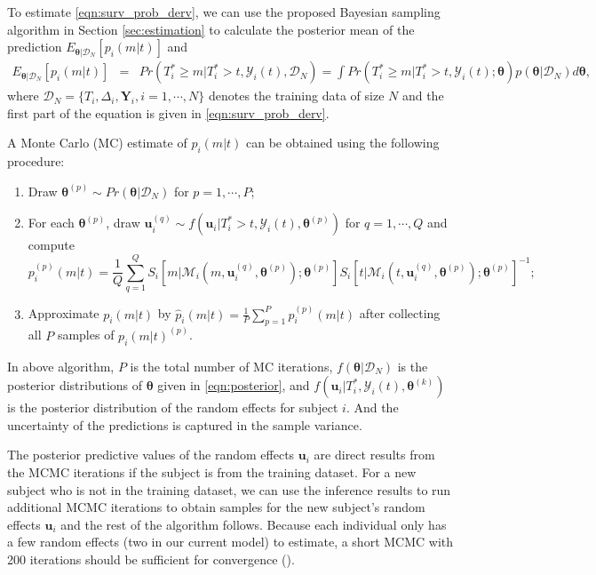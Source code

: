 To estimate \eqref{eqn:surv_prob_derv}, we can use the proposed Bayesian sampling algorithm in Section \ref{sec:estimation} to calculate the posterior mean of the prediction $E_{\boldsymbol{\theta}|\mathcal{D}_N}[p_i(m|t)]$ and
\begin{eqnarray}\label{eqn:expct_pred}
\nonumber E_{\boldsymbol{\theta}|\mathcal{D}_N}[p_i(m|t)]&=&Pr(T_i^*\ge m|T_i^*>t, \mathcal{Y}_{i}(t), \mathcal{D}_N)=\int Pr(T_i^*\ge m|T_i^*>t, \mathcal{Y}_{i}(t);\boldsymbol{\theta})p(\boldsymbol{\theta}|\mathcal{D}_N)d\boldsymbol{\theta},
\end{eqnarray}
where $\mathcal{D}_N=\{T_i, \Delta_i, \boldsymbol{Y}_i, i=1, \cdots, N\}$ denotes the training data of size $N$ and the first part of the equation is given in \eqref{eqn:surv_prob_derv}.

A Monte Carlo (MC) estimate of $p_i(m|t)$ can be obtained using the following procedure:
\begin{enumerate}
\item Draw $\boldsymbol{\theta}^{(p)} \sim Pr(\boldsymbol{\theta}|\mathcal{D}_N)$ for $p=1, \cdots, P$;
\item For each $\boldsymbol{\theta}^{(p)}$, draw ${\boldsymbol u}^{(q)}_i\sim f({\boldsymbol u}_i|T_i^*>t, \mathcal{Y}_{i}(t), \boldsymbol{\theta}^{(p)})$ for $q=1, \cdots, Q$ and compute $$p_i^{(p)}(m|t)=\frac{1}{Q}\sum_{q=1}^QS_i[m|\mathcal{M}_{i}(m, \boldsymbol{u}^{(q)}_i, \boldsymbol{\theta}^{(p)});\boldsymbol{\theta}^{(p)}]S_i[t|\mathcal{M}_{i}(t, \boldsymbol{u}^{(q)}_i, \boldsymbol{\theta}^{(p)});\boldsymbol{\theta}^{(p)}]^{-1};$$
\item Approximate $p_i(m|t)$ by $\hat{p}_i(m|t)=\frac{1}{P}\sum_{p=1}^P p^{(p)}_i(m|t)$ after collecting all $P$ samples of $p_i(m|t)^{(p)}$.
\end{enumerate}

In above algorithm, $P$ is the total number of MC iterations, $f(\boldsymbol{\theta}|\mathcal{D}_N)$ is the posterior distributions of $\boldsymbol{\theta}$ given in \eqref{eqn:posterior}, and $f({\boldsymbol u}_i|T_i^*, \mathcal{Y}_{i}(t), \boldsymbol{\theta}^{(k)})$ is the posterior distribution of the random effects for subject $i$. And the uncertainty of the predictions is captured in the sample variance.

The posterior predictive values of the random effects ${\boldsymbol u}_i$ are direct results from the MCMC iterations if the subject is from the training dataset. For a new subject who is not in the training dataset, we can use the inference results to run additional MCMC iterations to obtain samples for the new subject's random effects ${\boldsymbol u}_i$ and the rest of the algorithm follows. Because each individual only has a few random effects (two in our current model) to estimate, a short MCMC with 200 iterations should be sufficient for convergence (\citealp{taylor2013real}).

